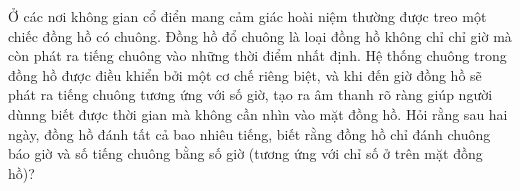 \begin{bt}%
	Ở các nơi không gian cổ điển mang cảm giác hoài niệm thường được treo một chiếc đồng hồ có chuông. Đồng hồ đổ chuông là loại đồng hồ không chỉ chỉ giờ mà còn phát ra tiếng chuông vào những thời điểm nhất định. Hệ thống chuông trong đồng hồ được điều khiển bởi một cơ chế riêng biệt, và khi đến giờ đồng hồ sẽ phát ra tiếng chuông tương ứng với số giờ, tạo ra âm thanh rõ ràng giúp người dùnng biết được thời gian mà không cần nhìn vào mặt đồng hồ. Hỏi rằng sau hai ngày, đồng hồ đánh tất cả bao nhiêu tiếng, biết rằng đồng hồ chỉ đánh chuông báo giờ và số tiếng chuông bằng số giờ (tương ứng với chỉ số ở trên mặt đồng hồ)?
\end{bt}

